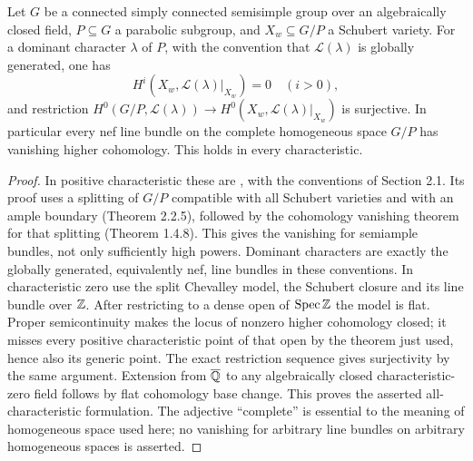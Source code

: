 \begin{theorem}\label{thm:B3-homogeneous}
Let $G$ be a connected simply connected semisimple group over an
algebraically closed field, $P\subseteq G$ a parabolic subgroup,
and $X_w\subseteq G/P$ a Schubert variety. For a dominant character
$\lambda$ of $P$, with the convention that $\mathcal L(\lambda)$
is globally generated, one has
\[
 H^i(X_w,\mathcal L(\lambda)|_{X_w})=0\quad(i>0),
\]
and restriction $H^0(G/P,\mathcal L(\lambda))\to
H^0(X_w,\mathcal L(\lambda)|_{X_w})$ is surjective.
In particular every nef line bundle on the complete homogeneous
space $G/P$ has vanishing higher cohomology. This holds in every
characteristic.
\end{theorem}
\begin{proof}
In positive characteristic these are
\cite[Theorem 3.1.1(a)--(b), pp.~85--86]{BBrionKumar}, with the
conventions of Section 2.1. Its proof uses a splitting of $G/P$
compatible with all Schubert varieties and with an ample boundary
(Theorem 2.2.5), followed by the cohomology vanishing theorem for that
splitting (Theorem 1.4.8). This gives the vanishing for semiample
bundles, not only sufficiently high powers. Dominant characters are
exactly the globally generated, equivalently nef, line bundles in
these conventions. In characteristic zero use the split Chevalley
model, the Schubert closure and its line bundle over ${\mathbb{Z}}$.
After restricting to a dense open of $\operatorname{Spec}{\mathbb{Z}}$ the
model is flat. Proper semicontinuity makes the locus of nonzero
higher cohomology closed; it misses every positive characteristic
point of that open by the theorem just used, hence also its generic
point. The exact restriction sequence gives surjectivity by the same
argument. Extension from $\overline{{\mathbb{Q}}}$ to any algebraically closed
characteristic-zero field follows by flat cohomology base change.
This proves the asserted all-characteristic formulation. The adjective
``complete'' is essential to the meaning of homogeneous space used
here; no vanishing for arbitrary line bundles on arbitrary homogeneous
spaces is asserted.
\end{proof}

